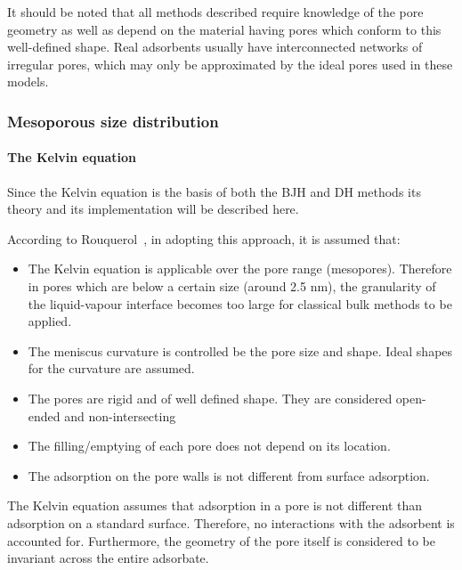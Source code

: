 It should be noted that all methods described require knowledge of
the pore geometry as well as depend on the material having pores which
conform to this well-defined shape. Real adsorbents usually have interconnected
networks of irregular pores, which may only be approximated by the
ideal pores used in these models.


\subsubsection{Mesoporous size distribution}

\paragraph{The Kelvin equation}

Since the Kelvin equation is the basis of both the BJH and DH methods
its theory and its implementation will be described here.



According to Rouquerol~\cite{rouquerolAdsorptionPowdersPorous2013}, 
in adopting this approach, it is assumed that:

\begin{itemize}
    
    \item The Kelvin equation is applicable over the pore range (mesopores). Therefore
    in pores which are below a certain size (around 2.5 nm), the granularity
    of the liquid-vapour interface becomes too large for classical bulk methods
    to be applied.
    \item The meniscus curvature is controlled be the pore size and shape. Ideal shapes
    for the curvature are assumed.
    \item The pores are rigid and of well defined shape. They are considered
    open-ended and non-intersecting
    \item The filling/emptying of each pore does not depend on its location.
    \item The adsorption on the pore walls is not different from surface adsorption.
        
\end{itemize}


The Kelvin equation assumes that adsorption in a pore is not different than adsorption
on a standard surface. Therefore, no interactions with the adsorbent is accounted for.
Furthermore, the geometry of the pore itself is considered to be invariant across the
entire adsorbate.

